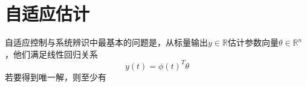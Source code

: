 \section{自适应估计}

\begin{frame}
    自适应控制与系统辨识中最基本的问题是，从标量输出$y\in\mathbb{R}$估计参数向量$\theta\in\mathbb{R}^n$，他们满足线性回归关系
    \begin{equation}
        y(t)=\phi(t)^T \theta
    \end{equation}
    若要得到唯一解，则至少有
\end{frame}
